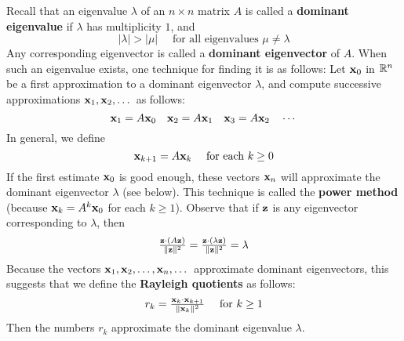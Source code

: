 Recall that an eigenvalue $\lambda$ of an $n \times n$ matrix $A$ is called a \textbf{dominant eigenvalue} if $\lambda$ has multiplicity $1$, and
\begin{equation*}
|\lambda| > |\mu| \quad \mbox{ for all eigenvalues } \mu \neq \lambda
\end{equation*}
Any corresponding eigenvector is called a \textbf{dominant eigenvector} of $A$. When such an eigenvalue exists, one technique for finding it is as follows: Let $\textbf{x}_{0}$ in $\mathbb{R}^n$ be a first approximation to a dominant eigenvector $\lambda$, and compute successive approximations $\textbf{x}_{1}, \textbf{x}_{2}, \dots$  as follows:
\begin{equation*}
\textbf{x}_{1} = A\textbf{x}_{0} \quad \textbf{x}_{2} = A\textbf{x}_{1} \quad \textbf{x}_{3} = A\textbf{x}_{2} \quad \cdots
\end{equation*}
In general, we define
\begin{equation*}
\textbf{x}_{k+1} = A\textbf{x}_{k} \quad \mbox{ for each } k \geq 0
\end{equation*}
If the first estimate $\textbf{x}_{0}$ is good enough, these vectors $\textbf{x}_{n}$ will approximate the dominant eigenvector $\lambda$ (see below). This technique is called the \textbf{power method} (because $\textbf{x}_{k} = A^{k}\textbf{x}_{0}$ for each $k \geq 1$). Observe that if $\textbf{z}$ is any eigenvector corresponding to $\lambda$, then
\begin{equation*}
\tfrac{\textbf{z} \cdot (A\textbf{z})}{\| \textbf{z} \|^2} = \tfrac{\textbf{z} \cdot (\lambda\textbf{z})}{\| \textbf{z} \|^2} = \lambda
\end{equation*}
Because the vectors $\textbf{x}_{1}, \textbf{x}_{2}, \dots, \textbf{x}_{n}, \dots$  approximate dominant eigenvectors, this suggests that we define the \textbf{Rayleigh quotients} as follows:
\begin{equation*}
r_{k} = \tfrac{\textbf{x}_{k} \cdot \textbf{x}_{k+1}}{\| \textbf{x}_{k} \|^2} \quad \mbox{ for } k \geq 1
\end{equation*}
Then the numbers $r_{k}$ approximate the dominant eigenvalue $\lambda$.


